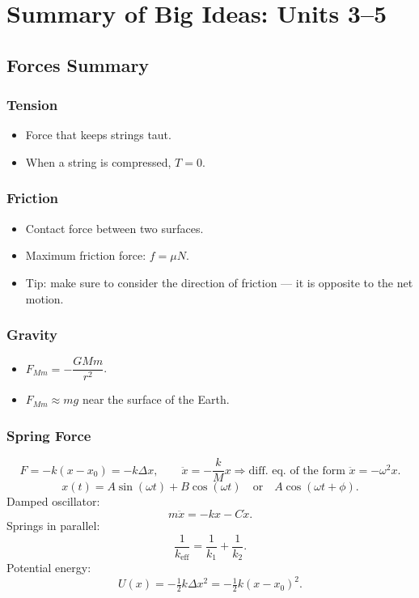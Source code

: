\chapter{Summary of Big Ideas: Units 3--5}

\section{Forces Summary}

\subsection{Tension}
\begin{itemize}
    \item Force that keeps strings taut.
    \item When a string is compressed, $T = 0$.
\end{itemize}

\subsection{Friction}
\begin{itemize}
    \item Contact force between two surfaces.
    \item Maximum friction force: $f = \mu N$.
    \item Tip: make sure to consider the direction of friction — it is opposite to the net motion.
\end{itemize}

\subsection{Gravity}
\begin{itemize}
    \item $F_{Mm} = -\dfrac{GMm}{r^2}$.
    \item $F_{Mm} \approx mg$ near the surface of the Earth.
\end{itemize}

\subsection{Spring Force}
\[
    F = -k(x - x_0) = -k\Delta x, \qquad \ddot{x} = -\frac{k}{M}x \Rightarrow \text{diff. eq. of the form } \ddot{x} = -\omega^2 x.
\]
\[
    x(t) = A\sin(\omega t) + B\cos(\omega t) \quad \text{or} \quad A\cos(\omega t + \phi).
\]
Damped oscillator:
\[
    m\ddot{x} = -kx - C\dot{x}.
\]
Springs in parallel:
\[
    \frac{1}{k_{\text{eff}}} = \frac{1}{k_1} + \frac{1}{k_2}.
\]
Potential energy:
\[
    U(x) = -\tfrac{1}{2}k\Delta x^2 = -\tfrac{1}{2}k(x-x_0)^2.
\]

